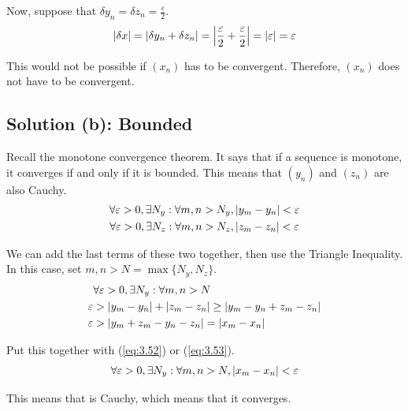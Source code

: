 \documentclass[12pt]{report}
\begin{document}
        Now, suppose that $\delta y_n = \delta z_n = \frac{\varepsilon}{2}$.
        \begin{equation}
            \left| \delta x \right|  =   \left| \delta y_n + \delta z_n \right|
                =   \left| \frac{\varepsilon}2 + \frac{\varepsilon}2 \right|
                =   \left| \varepsilon \right|
                =   \varepsilon
        \end{equation}

        This would not be possible if $(x_n)$ has to be convergent.
        Therefore, $(x_n)$ does not have to be convergent.

    \subsection{Solution (b): Bounded}
        Recall the monotone convergence theorem.
        It says that if a sequence is monotone, it converges if and only if it is bounded.
        This means that $(y_n)$ and $(z_n)$ are also Cauchy.
        \begin{gather} \label{eq:3.52}
            \forall \varepsilon > 0, \exists N_y : \forall m, n > N_y, \left| y_m - y_n \right| < \varepsilon\\
            \label{eq:3.53}
            \forall \varepsilon > 0, \exists N_z : \forall m, n > N_z, \left| z_m - z_n \right| < \varepsilon
        \end{gather}

        We can add the last terms of these two together, then use the Triangle Inequality.
        In this case, set $m, n > N = \max\{N_y, N_z\}$.
        \begin{align}
            &\forall \varepsilon > 0, \exists N_y : \forall m, n > N\\
            \varepsilon &>  \left| y_m - y_n \right| + \left| z_m - z_n \right|
                \geq    \left| y_m - y_n + z_m - z_n \right|\\
            \varepsilon &>  \left| y_m + z_m - y_n - z_n \right|
                =   \left| x_m - x_n \right|
        \end{align}

        Put this together with (\ref{eq:3.52}) or (\ref{eq:3.53}).
        \begin{equation}
            \forall \varepsilon > 0, \exists N_y : \forall m, n > N, \left| x_m - x_n \right| < \varepsilon
        \end{equation}

        This means that  is Cauchy, which means that it converges.
\end{document}
